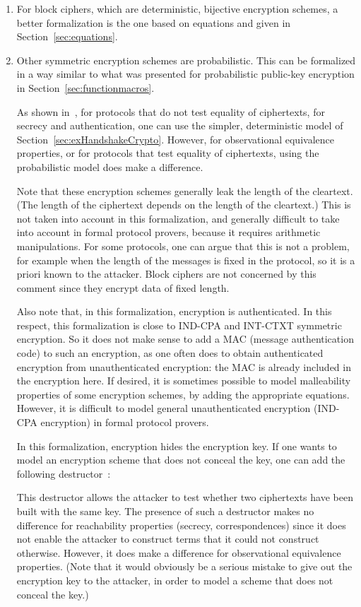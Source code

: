 \documentclass{book}
\begin{document}
\begin{enumerate}
\item For block ciphers, which are deterministic, bijective encryption schemes, a better formalization is the one based on equations and given in Section~\ref{sec:equations}.
\item Other symmetric encryption schemes are probabilistic. This can be formalized in a way similar to what was presented for probabilistic public-key encryption in Section~\ref{sec:functionmacros}.

%
As shown in~\cite{Cortier06b}, for protocols that do not test equality of ciphertexts, for secrecy and authentication, one can use the simpler, deterministic model of Section~\ref{sec:exHandshakeCrypto}. However, for observational equivalence properties, or for protocols that test equality of ciphertexts, using the probabilistic model does make a difference.

Note that these encryption schemes generally leak the length of the cleartext. (The length of the ciphertext depends on the length of the cleartext.) This is not taken into account in this formalization, and generally difficult to take into account in formal protocol provers, because it requires arithmetic manipulations. For some protocols, one can argue that this is not a problem, for example when the length of the messages is fixed in the protocol, so it is a priori known to the attacker. Block ciphers are not concerned by this comment since they encrypt data of fixed length.

Also note that, in this formalization, encryption is authenticated. In this respect, this formalization is close to IND-CPA and INT-CTXT symmetric encryption. So it does not make sense to add a MAC (message authentication code) to such an encryption, as one often does to obtain authenticated encryption from unauthenticated encryption: the MAC is already included in the encryption here. If desired, it is sometimes possible to model malleability properties of some encryption schemes, by adding the appropriate equations. However, it is difficult to model general unauthenticated encryption (IND-CPA encryption) in formal protocol provers.

In this formalization, encryption hides the encryption key. If one wants to model an encryption scheme that does not conceal the key, one can add the following destructor~\cite{Abadi09}:

This destructor allows the attacker to test whether two ciphertexts have been built with the same key. The presence of such a destructor makes no difference for reachability properties (secrecy, correspondences) since it does not enable the attacker to construct terms that it could not construct otherwise. However, it does make a difference for observational equivalence properties.
(Note that it would obviously be a serious mistake to give out the encryption key to the attacker, in order to model a scheme that does not conceal the key.)

\end{enumerate}
\end{document}
